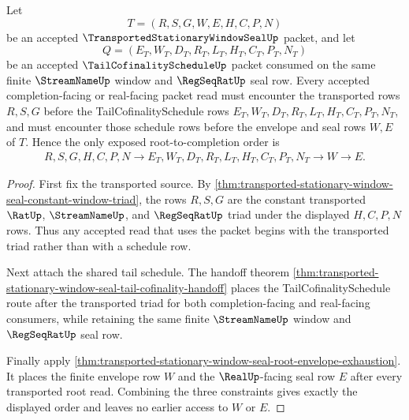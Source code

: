 \begin{theorem}
\label{thm:transported-stationary-window-seal-tail-schedule-envelope-order}
Let
$$
T=(R,S,G,W,E,H,C,P,N)
$$
be an accepted $\TransportedStationaryWindowSealUp$ packet, and let
$$
Q=(E_T,W_T,D_T,R_T,L_T,H_T,C_T,P_T,N_T)
$$
be an accepted $\TailCofinalityScheduleUp$ packet consumed on the same finite $\StreamNameUp$ window and $\RegSeqRatUp$ seal row. Every accepted completion-facing or real-facing packet read must encounter the transported rows $R,S,G$ before the TailCofinalitySchedule rows $E_T,W_T,D_T,R_T,L_T,H_T,C_T,P_T,N_T$, and must encounter those schedule rows before the envelope and seal rows $W,E$ of $T$. Hence the only exposed root-to-completion order is
$$
\begin{aligned}
  R,S,G,H,C,P,N
  \longrightarrow
  E_T,W_T,D_T,R_T,L_T,H_T,C_T,P_T,N_T
  \longrightarrow
  W
  \longrightarrow
  E .
\end{aligned}
$$
\end{theorem}
\begin{proof}
First fix the transported source. By \autoref{thm:transported-stationary-window-seal-constant-window-triad}, the rows $R,S,G$ are the constant transported $\RatUp$, $\StreamNameUp$, and $\RegSeqRatUp$ triad under the displayed $H,C,P,N$ rows. Thus any accepted read that uses the packet begins with the transported triad rather than with a schedule row.

Next attach the shared tail schedule. The handoff theorem \autoref{thm:transported-stationary-window-seal-tail-cofinality-handoff} places the TailCofinalitySchedule route after the transported triad for both completion-facing and real-facing consumers, while retaining the same finite $\StreamNameUp$ window and $\RegSeqRatUp$ seal row.

Finally apply \autoref{thm:transported-stationary-window-seal-root-envelope-exhaustion}. It places the finite envelope row $W$ and the $\RealUp$-facing seal row $E$ after every transported root read. Combining the three constraints gives exactly the displayed order and leaves no earlier access to $W$ or $E$.
\end{proof}

